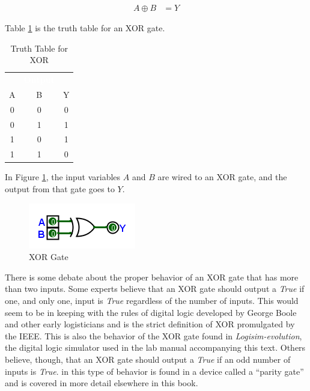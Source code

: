 \begin{align}
  \label{BF:eq:xor_symbol}
  A \oplus B &= Y
\end{align}

Table \ref{BF:tab:truth_table_for_xor} is the truth table for an \textsf{XOR}  gate.

\begin{table}[H]
  \sffamily
  \newcommand{\head}[1]{\textcolor{white}{\textbf{#1}}}    
  \begin{center}
    \begin{tabular}{ccc} 
      \rowcolor{black!75}
      \multicolumn{2}{c}{\head{Inputs}} & \head{Output} \\
      A & B & Y \\
      \hline
      0 & 0 & 0 \\
      0 & 1 & 1 \\
      1 & 0 & 1 \\
      1 & 1 & 0 
    \end{tabular}
  \end{center}
  \caption{Truth Table for XOR}
  \label{BF:tab:truth_table_for_xor}
\end{table}

In Figure \ref{fig:04_07}, the input variables $ A $ and $ B $ are wired to an \textsf{XOR}  gate, and the output from that gate goes to $ Y $. 

\begin{figure}[H]
	\centering
	\includegraphics[width=\maxwidth{.95\linewidth}]{gfx/04_07}
	\caption{XOR Gate}
	\label{fig:04_07}
\end{figure}


There is some debate about the proper behavior of an \textsf{XOR}  gate that has more than two inputs. Some experts believe that an \textsf{XOR} gate should output a \emph{True} if one, and only one, input is \emph{True} regardless of the number of inputs. This would seem to be in keeping with the rules of digital logic developed by George Boole and other early logisticians and is the strict definition of \textsf{XOR} promulgated by the \ac{IEEE}. This is also the behavior of the \textsf{XOR} gate found in \textit{Logisim-evolution}, the digital logic simulator used in the lab manual accompanying this text. Others believe, though, that an \textsf{XOR} gate should output a \emph{True} if an odd number of inputs is \emph{True}. in \Le this type of behavior is found in a device called a ``parity gate'' and is covered in more detail elsewhere in this book.

